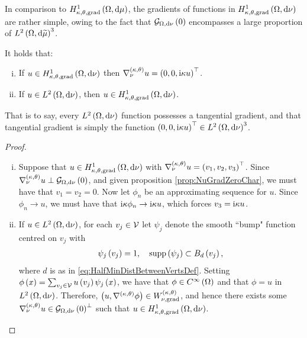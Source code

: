 In comparison to $H^1_{\kappa,\theta,\mathrm{grad}}\left( \Omega, \mathrm{d}\mu \right)$, the gradients of functions in $H^1_{\kappa,\theta,\mathrm{grad}}\left( \Omega, \mathrm{d}\nu \right)$ are rather simple, owing to the fact that $\mathcal{G}_{ \Omega, \mathrm{d}\nu}\left( 0 \right)$ encompasses a large proportion of $L^{2}\left( \Omega,\mathrm{d}\widetilde{\mu} \right)^3$.
\begin{cory} \label{cory:NuTangGradChar}
	It holds that:
	\begin{enumerate}[(i)]
		\item If $u\in H^1_{\kappa,\theta,\mathrm{grad}}\left( \Omega, \mathrm{d}\nu \right)$ then $\nabla^{\left( \kappa, \theta \right)}_{\nu}u = \left( 0,0,\mathrm{i}\kappa u \right)^\top$.
		\item If $u\in L^{2}\left( \Omega,\mathrm{d}\nu \right)$, then $u\in H^1_{\kappa,\theta,\mathrm{grad}}\left( \Omega, \mathrm{d}\nu \right)$.
	\end{enumerate}
\end{cory}
That is to say, every $L^{2}\left( \Omega,\mathrm{d}\nu \right)$ function possesses a tangential gradient, and that tangential gradient is simply the function $\left( 0,0,\mathrm{i}\kappa u \right)^\top\in L^{2}\left( \Omega,\mathrm{d}\nu \right)^3$.
\begin{proof}
	\begin{enumerate}[(i)]
		\item Suppose that $u\in H^1_{\kappa,\theta,\mathrm{grad}}\left( \Omega, \mathrm{d}\nu \right)$ with $\nabla^{\left( \kappa, \theta \right)}_{\nu}u = \left( v_1,v_2,v_3 \right)^\top$.
		Since $\nabla^{\left( \kappa, \theta \right)}_{\nu}u\perp\mathcal{G}_{ \Omega, \mathrm{d}\nu}\left( 0 \right)$, and given proposition \ref{prop:NuGradZeroChar}, we must have that $v_1 = v_2 = 0$.
		Now let $\phi_n$ be an approximating sequence for $u$.
		Since $\phi_n\rightarrow u$, we must have that $\mathrm{i}\kappa\phi_n\rightarrow\mathrm{i}\kappa u$, which forces $v_3 = \mathrm{i}\kappa u$.
		\item If $u\in L^{2}\left( \Omega,\mathrm{d}\nu \right)$, for each $v_j\in\mathcal{V}$ let $\psi_j$ denote the smooth ``bump" function centred on $v_j$ with
		\begin{align*}
			\psi_j\left( v_j \right) = 1, \quad \mathrm{supp}\left( \psi_j \right)\subset B_d\left( v_j \right),
		\end{align*}
		where $d$ is as in \eqref{eq:HalfMinDistBetweenVertsDef}.
		Setting $\phi\left( x \right) = \sum_{v_j\in\mathcal{V}}u\left( v_j \right)\psi_j\left( x \right)$, we have that $\phi\in C^{\infty}\left( \Omega \right)$ and that $\phi = u$ in $L^{2}\left( \Omega,\mathrm{d}\nu \right)$.
		Therefore, $\left( u, \nabla^{\left( \kappa, \theta \right)}\phi \right)\in W^{\left( \kappa, \theta \right)}_{\nu,\mathrm{grad}}$, and hence there exists some $\nabla^{\left( \kappa, \theta \right)}_\nu u\in\mathcal{G}_{ \Omega, \mathrm{d}\nu}\left( 0 \right)^\perp$ such that $u\in H^1_{\kappa,\theta,\mathrm{grad}}\left( \Omega, \mathrm{d}\nu \right)$.
	\end{enumerate}
\end{proof}

